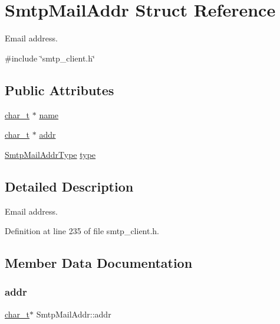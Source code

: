 \hypertarget{structSmtpMailAddr}{}\section{Smtp\+Mail\+Addr Struct Reference}
\label{structSmtpMailAddr}


Email address.  




{\ttfamily \#include \char`\"{}smtp\+\_\+client.\+h\char`\"{}}

\subsection*{Public Attributes}
\begin{DoxyCompactItemize}
\item 
\hyperlink{compiler__port_8h_a40bb5262bf908c328fbcfbe5d29d0201}{char\+\_\+t} $\ast$ \hyperlink{structSmtpMailAddr_abe3a319474a330d936a68706c96a6035}{name}
\item 
\hyperlink{compiler__port_8h_a40bb5262bf908c328fbcfbe5d29d0201}{char\+\_\+t} $\ast$ \hyperlink{structSmtpMailAddr_aee3796762170dbb8b894acb870ec2f66}{addr}
\item 
\hyperlink{smtp__client_8h_aeee50722ccc5015c4fdc33b13819126e}{Smtp\+Mail\+Addr\+Type} \hyperlink{structSmtpMailAddr_a7c5a5b0c3fd17a3256564105e46a3933}{type}
\end{DoxyCompactItemize}


\subsection{Detailed Description}
Email address. 

Definition at line 235 of file smtp\+\_\+client.\+h.



\subsection{Member Data Documentation}
\mbox{\label{structSmtpMailAddr_aee3796762170dbb8b894acb870ec2f66}} 
\subsubsection{\texorpdfstring{addr}{addr}}
{\footnotesize\ttfamily \hyperlink{compiler__port_8h_a40bb5262bf908c328fbcfbe5d29d0201}{char\+\_\+t}$\ast$ Smtp\+Mail\+Addr\+::addr}



